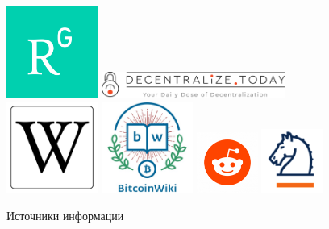 \documentclass{beamer}
\begin{document}
\begin{frame}
    \begin{figure}
    \includegraphics[width=3cm]{rg_logo}\pause
    \vfill
    \includegraphics[width=6cm]{decentr_logo}\pause
    \includegraphics[width=3cm]{wiki_logo}\pause
    \includegraphics[width=3cm]{btcwiki_logo}\pause
    \hfill
    \includegraphics[width=2cm]{reddit_logo}\pause
    \includegraphics[width=2cm]{springer_logo}
        \caption{Источники информации}
    \end{figure}
\end{frame}
\end{document}
